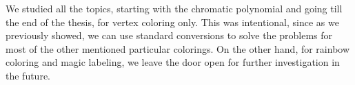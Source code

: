 We studied all the topics, starting with the chromatic polynomial and going till the end of the thesis, for vertex coloring only. This was intentional, since as we previously showed, we can use standard conversions to solve the problems for most of the other mentioned particular colorings. On the other hand, for rainbow coloring and magic labeling, we leave the door open for further investigation in the future.


